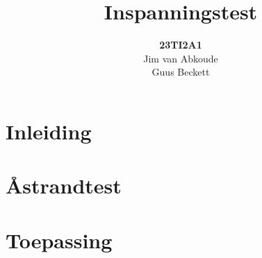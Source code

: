 \documentclass[]{article}
\begin{document}
\title{Inspanningstest}

\author{\textbf{23TI2A1}\\Jim van Abkoude\\Guus Beckett }
\maketitle
\newpage
\tableofcontents
\newpage
\section{Inleiding}
\section{\r{A}strandtest}
\section{Toepassing}
\end{document}
